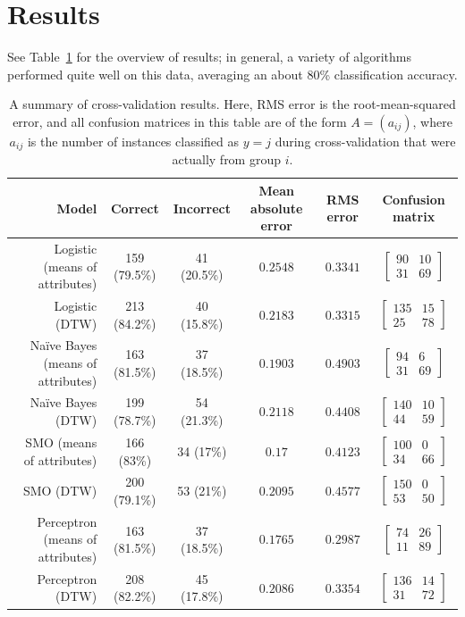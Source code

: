 \documentclass{amsart}
\newcommand{\mat}[4]{\begin{bmatrix} {#1} & {#2}\\{#3} & {#4}\end{bmatrix}}
\begin{document}


\section{Results}
See Table~\ref{resultstable} for the overview of results; in general, a variety of algorithms performed quite well on this data, averaging an about 80\% classification accuracy.
\begin{table}[!ht]
	\label{resultstable}
	\begin{tabular}{r|c c c c c}
	Model & Correct & Incorrect & Mean absolute error & RMS error & Confusion matrix\\
	\hline
	Logistic (means of attributes) & 159 (79.5\%) & 41 (20.5\%) & $0.2548$ & $0.3341$ & $\mat{90}{10}{31}{69}$\\
	Logistic (DTW) & 213 (84.2\%) & 40 (15.8\%) & $0.2183$ & $0.3315$ & $\mat{135}{15}{25}{78}$\\
	Na\"ive Bayes (means of attributes) & 163 (81.5\%) & 37 (18.5\%) & $0.1903$ & $0.4903$ & $\mat{94}{6}{31}{69}$\\
	Na\"ive Bayes (DTW) & 199 (78.7\%) & 54 (21.3\%) & $0.2118$ & $0.4408$ & $\mat{140}{10}{44}{59}$\\
	SMO (means of attributes) & 166 (83\%) & 34 (17\%) & $0.17$ & $0.4123$ & $\mat{100}{0}{34}{66}$\\
	SMO (DTW) & 200 (79.1\%) & 53 (21\%) & $0.2095$ & $0.4577$ & $\mat{150}{0}{53}{50}$\\
	Perceptron (means of attributes) & 163 (81.5\%) & 37 (18.5\%) & $0.1765$ & $0.2987$ & $\mat{74}{26}{11}{89}$\\
	Perceptron (DTW) & 208 (82.2\%) & 45 (17.8\%) & $0.2086$ & $0.3354$ & $\mat{136}{14}{31}{72}$
	\end{tabular}
	\caption{A summary of cross-validation results. Here, RMS error is the root-mean-squared error, and all confusion matrices in this table are of the form $A = (a_{ij})$, where $a_{ij}$ is the number of instances classified as $y = j$ during cross-validation that were actually from group $i$.}
\end{table}
\end{document}
